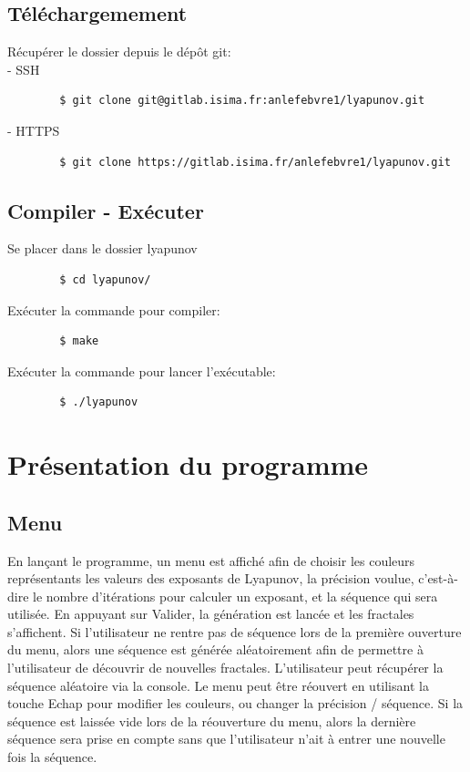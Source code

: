 \documentclass{article}
\begin{document}
	\subsection{Téléchargemement}
	\noindent Récupérer le dossier depuis le dépôt git:\\
	- SSH
	\begin{lstlisting}
		$ git clone git@gitlab.isima.fr:anlefebvre1/lyapunov.git
	\end{lstlisting}
	- HTTPS
	\begin{lstlisting}
		$ git clone https://gitlab.isima.fr/anlefebvre1/lyapunov.git
	\end{lstlisting}
	\subsection{Compiler - Exécuter}
	\noindent Se placer dans le dossier lyapunov
	\begin{lstlisting}
		$ cd lyapunov/
	\end{lstlisting}
	Exécuter la commande pour compiler:
	\begin{lstlisting}
		$ make
	\end{lstlisting}
	Exécuter la commande pour lancer l'exécutable:
	\begin{lstlisting}
		$ ./lyapunov
	\end{lstlisting}

	\section{Présentation du programme}

	\subsection{Menu}

	En lançant le programme, un menu est affiché afin de choisir les couleurs représentants les valeurs des exposants de Lyapunov, la précision voulue, c'est-à-dire le nombre d'itérations pour calculer un exposant, et la séquence qui sera utilisée.
	En appuyant sur Valider, la génération est lancée et les fractales s'affichent.
	Si l'utilisateur ne rentre pas de séquence lors de la première ouverture du menu, alors une séquence est générée aléatoirement afin de permettre à l'utilisateur de découvrir de nouvelles fractales.
	L'utilisateur peut récupérer la séquence aléatoire via la console.
	Le menu peut être réouvert en utilisant la touche Echap pour modifier les couleurs, ou changer la précision / séquence.
	Si la séquence est laissée vide lors de la réouverture du menu, alors la dernière séquence sera prise en compte sans que l'utilisateur n'ait à entrer une nouvelle fois la séquence.
\end{document}
